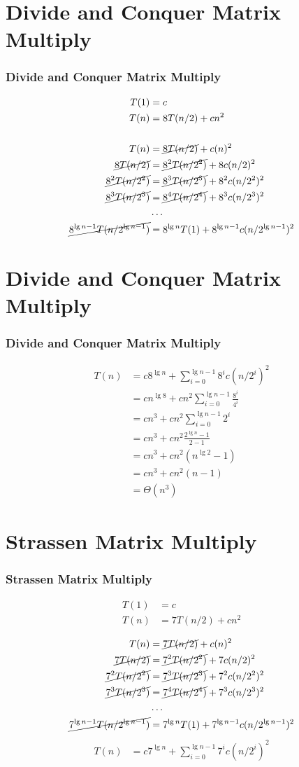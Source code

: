 \documentclass{beamer}
\newcommand{\sect}[1]{
\section{#1}
\begin{frame}[fragile]\frametitle{#1}
}
\begin{document}
\sect{Divide and Conquer Matrix Multiply}

\begin{align*}
  T(1) &= c\\
  T(n) &= 8T(n/2) + cn^2
  \\\\
  T(n) &= \cancel{8T(n/2)} + c(n)^2\\
  \cancel{8T(n/2)} &= \cancel{8^2T(n/2^2)} + 8c(n/2)^2 \\
  \cancel{8^2T(n/2^2)} &= \cancel{8^3T(n/2^3)} + 8^2c(n/2^2)^2\\
  \cancel{8^3T(n/2^3)} &= \cancel{8^4T(n/2^4)} + 8^3c(n/2^3)^2\\
  &\ldots\\
  \cancel{8^{\lg n - 1}T(n/2^{\lg n - 1})} &= 8^{\lg n}T(1) + 8^{\lg n - 1}c(n/2^{\lg n - 1})^2
\end{align*}

\end{frame}
\sect{Divide and Conquer Matrix Multiply}
\begin{align*}
  T(n) &=  c8^{\lg n} + \sum_{i=0}^{\lg n -1}8^ic(n/2^{i})^2\\
  &=   cn^{\lg 8} + cn^2\sum_{i=0}^{\lg n -1}\frac{8^i}{4^i}\\
  &=   cn^3 + cn^2\sum_{i=0}^{\lg n -1}2^i\\
  &=   cn^3 + cn^2\frac{2^{\lg n} - 1}{2-1}\\
  &=   cn^3 + cn^2(n^{\lg 2} - 1)\\
  &=   cn^3 + cn^2(n - 1)\\
  &= \Theta(n^3)
  \end{align*}
\end{frame}

\sect{Strassen Matrix Multiply}
\begin{align*}
  T(1) &= c\\
  T(n) &= 7T(n/2) + cn^2
\end{align*}

\begin{align*}
  T(n) &= \cancel{7T(n/2)} + c(n)^2\\
  \cancel{7T(n/2)} &= \cancel{7^2T(n/2^2)} + 7c(n/2)^2 \\
  \cancel{7^2T(n/2^2)} &= \cancel{7^3T(n/2^3)} + 7^2c(n/2^2)^2\\
  \cancel{7^3T(n/2^3)} &= \cancel{7^4T(n/2^4)} + 7^3c(n/2^3)^2\\
  &\ldots\\
  \cancel{7^{\lg n - 1}T(n/2^{\lg n - 1})} &= 7^{\lg n}T(1) + 7^{\lg n - 1}c(n/2^{\lg n - 1})^2
  \end{align*}
\begin{align*}
  T(n) &=  c7^{\lg n} + \sum_{i=0}^{\lg n -1}7^ic(n/2^{i})^2\\
\end{align*}
\end{frame}
\end{document}
